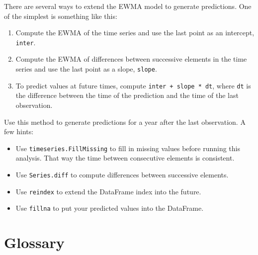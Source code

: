 \documentclass[12pt]{book}
\begin{document}
\begin{exercise}
There are several ways to extend the EWMA model to generate predictions.
One of the simplest is something like this:

\begin{enumerate}

\item Compute the EWMA of the time series and use the last point
as an intercept, \verb"inter".

\item Compute the EWMA of differences between successive elements in
the time series and use the last point as a slope, \verb"slope".

\item To predict values at future times, compute \verb"inter + slope * dt",
where \verb"dt" is the difference between the time of the prediction and
the time of the last observation.

\end{enumerate}

Use this method to generate predictions for a year after the last
observation.  A few hints:

\begin{itemize}

\item Use \verb"timeseries.FillMissing" to fill in missing values
before running this analysis.  That way the time between consecutive
elements is consistent.

\item Use \verb"Series.diff" to compute differences between successive
elements.

\item Use \verb"reindex" to extend the DataFrame index into the future.

\item Use \verb"fillna" to put your predicted values into the DataFrame.

\end{itemize}

\end{exercise}


\section{Glossary}
\end{document}
